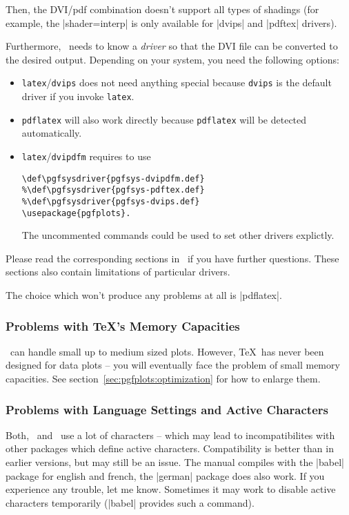 Then, the DVI/pdf combination doesn't support all types of shadings (for example, the |shader=interp| is only available for |dvips| and |pdftex| drivers).

Furthermore, \PGF\ needs to know a \emph{driver} so that the DVI file can be converted to the desired output. Depending on your system, you need the following options:
\begin{itemize}
	\item \lstinline!latex!/\lstinline!dvips! does not need anything special because \lstinline!dvips! is the default driver if you invoke \lstinline!latex!.
	\item \lstinline!pdflatex! will also work directly because \lstinline!pdflatex! will be detected automatically.
	\item \lstinline!latex!/\lstinline!dvipdfm! requires to use
\begin{verbatim}
\def\pgfsysdriver{pgfsys-dvipdfm.def}
%\def\pgfsysdriver{pgfsys-pdftex.def}
%\def\pgfsysdriver{pgfsys-dvips.def}
\usepackage{pgfplots}.
\end{verbatim}
	The uncommented commands could be used to set other drivers explictly.
\end{itemize}
Please read the corresponding sections in~\cite[Section 7.2.1 and 7.2.2]{tikz} if you have further questions. These sections also contain limitations of particular drivers.

The choice which won't produce any problems at all is |pdflatex|.

\subsubsection{Problems with \TeX's Memory Capacities}
\PGFPlots\ can handle small up to medium sized plots. However, \TeX\ has never been designed for data plots -- you will eventually face the problem of small memory capacities. See section~\ref{sec:pgfplots:optimization} for how to enlarge them.

\subsubsection{Problems with Language Settings and Active Characters}
Both, \PGF\ and \PGFPlots\ use a lot of characters -- which may lead to incompatibilites with other packages which define active characters. Compatibility is better than in earlier versions, but may still be an issue. The manual compiles with the |babel| package for english and french, the |german| package does also work. If you experience any trouble, let me know. Sometimes it may work to disable active characters temporarily (|babel| provides such a command).

